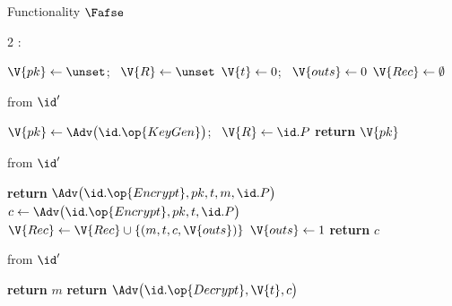 \begin{interface}[nofloat]{Functionality $\Fafse$ \\
}

{\scriptsize
\setlength{\columnsep}{1.4em}
\begin{multicols}{2}
:
\begin{algorithmic}[1]
\setcounter{contline}{0}\algcont
\State $\V{pk} \gets \unset$; \ $\V{R} \gets \unset$
\State $\V{t} \gets 0$; \ $\V{outs} \gets 0$
\State $\V{Rec} \gets \emptyset$
\algsave
\end{algorithmic}
\vspace{1.4ex}

 \quad from $\id'$
\begin{algorithmic}[1]
\algcont
{} \label{ln:afseonce}
\State $\V{pk} \gets \Adv\bigl(\id.\op{KeyGen}\bigr)$; \ $\V{R} \gets \id.P$
\State \textbf{return} $\V{pk}$
\algsave
\end{algorithmic}
\vspace{1.4ex}

 \quad from $\id'$
\begin{algorithmic}[1]
\algcont
{} \label{ln:afsegiveup}
  \State \textbf{return} $\Adv\bigl(\id.\op{Encrypt}, pk, t, m, \id.P\bigr)$ \label{ln:afsedummy}
\EndIf
\State $c \gets \Adv\bigl(\id.\op{Encrypt}, pk, t, \id.P\bigr)$ \label{ln:afsehide}
  \State $\V{Rec} \gets \V{Rec} \cup \{(m, t, c, \V{outs})\}$ \label{ln:afserecord}
  \State $\V{outs} \gets 1$ \label{ln:afseoutstanding}
\EndIf
\State \textbf{return} $c$
\algsave
\end{algorithmic}
\vspace{1.4ex}

\columnbreak

 \quad from $\id'$
\begin{algorithmic}[1]
\algcont
{}
 \label{ln:afsecurrent}
  \State \textbf{return} $m$ \label{ln:afsecorrect}
\EndIf
\State \textbf{return} $\Adv\bigl(\id.\op{Decrypt}, \V{t}, c\bigr)$
\algsave
\end{algorithmic}
\vspace{1.4ex}


\end{multicols}}
\end{interface}
